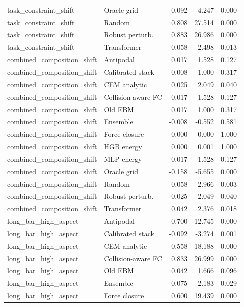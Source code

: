 {\begin{longtable}{llrrr}
task\_constraint\_shift & Oracle grid & 0.092 & 4.247 & 0.000 \\
task\_constraint\_shift & Random & 0.808 & 27.514 & 0.000 \\
task\_constraint\_shift & Robust perturb. & 0.883 & 26.986 & 0.000 \\
task\_constraint\_shift & Transformer & 0.058 & 2.498 & 0.013 \\
combined\_composition\_shift & Antipodal & 0.017 & 1.528 & 0.127 \\
combined\_composition\_shift & Calibrated stack & -0.008 & -1.000 & 0.317 \\
combined\_composition\_shift & CEM analytic & 0.025 & 2.049 & 0.040 \\
combined\_composition\_shift & Collision-aware FC & 0.017 & 1.528 & 0.127 \\
combined\_composition\_shift & Old EBM & 0.017 & 1.000 & 0.317 \\
combined\_composition\_shift & Ensemble & -0.008 & -0.552 & 0.581 \\
combined\_composition\_shift & Force closure & 0.000 & 0.000 & 1.000 \\
combined\_composition\_shift & HGB energy & 0.000 & 0.001 & 1.000 \\
combined\_composition\_shift & MLP energy & 0.017 & 1.528 & 0.127 \\
combined\_composition\_shift & Oracle grid & -0.158 & -5.655 & 0.000 \\
combined\_composition\_shift & Random & 0.058 & 2.966 & 0.003 \\
combined\_composition\_shift & Robust perturb. & 0.025 & 2.049 & 0.040 \\
combined\_composition\_shift & Transformer & 0.042 & 2.376 & 0.018 \\
long\_bar\_high\_aspect & Antipodal & 0.700 & 12.745 & 0.000 \\
long\_bar\_high\_aspect & Calibrated stack & -0.092 & -3.274 & 0.001 \\
long\_bar\_high\_aspect & CEM analytic & 0.558 & 18.188 & 0.000 \\
long\_bar\_high\_aspect & Collision-aware FC & 0.833 & 26.999 & 0.000 \\
long\_bar\_high\_aspect & Old EBM & 0.042 & 1.666 & 0.096 \\
long\_bar\_high\_aspect & Ensemble & -0.075 & -2.183 & 0.029 \\
long\_bar\_high\_aspect & Force closure & 0.600 & 19.439 & 0.000 \\

\end{longtable}}
